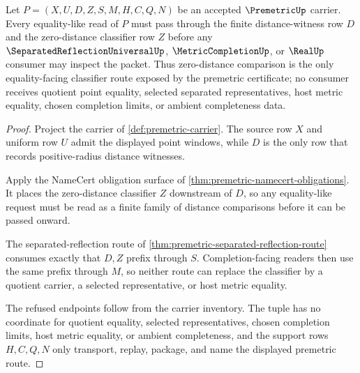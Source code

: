 \begin{theorem}
\label{thm:premetric-zero-distance-classifier-boundary}
Let $P=(X,U,D,Z,S,M,H,C,Q,N)$ be an accepted $\PremetricUp$ carrier. Every equality-like read of $P$ must pass through the finite distance-witness row $D$ and the zero-distance classifier row $Z$ before any $\SeparatedReflectionUniversalUp$, $\MetricCompletionUp$, or $\RealUp$ consumer may inspect the packet. Thus zero-distance comparison is the only equality-facing classifier route exposed by the premetric certificate; no consumer receives quotient point equality, selected separated representatives, host metric equality, chosen completion limits, or ambient completeness data.
\end{theorem}
\begin{proof}
Project the carrier of \autoref{def:premetric-carrier}. The source row $X$ and uniform row $U$ admit the displayed point windows, while $D$ is the only row that records positive-radius distance witnesses.

Apply the NameCert obligation surface of \autoref{thm:premetric-namecert-obligations}. It places the zero-distance classifier $Z$ downstream of $D$, so any equality-like request must be read as a finite family of distance comparisons before it can be passed onward.

The separated-reflection route of \autoref{thm:premetric-separated-reflection-route} consumes exactly that $D,Z$ prefix through $S$. Completion-facing readers then use the same prefix through $M$, so neither route can replace the classifier by a quotient carrier, a selected representative, or host metric equality.

The refused endpoints follow from the carrier inventory. The tuple has no coordinate for quotient equality, selected representatives, chosen completion limits, host metric equality, or ambient completeness, and the support rows $H,C,Q,N$ only transport, replay, package, and name the displayed premetric route.
\end{proof}


